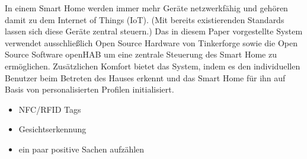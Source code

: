 %
In einem Smart Home werden immer mehr Geräte netzwerkfähig und gehören damit zu dem Internet of Things (IoT).
(Mit bereits existierenden Standards lassen sich diese Geräte zentral steuern.)
Das in diesem Paper vorgestellte System verwendet ausschließlich Open Source Hardware von Tinkerforge sowie die Open Source Software openHAB
um eine zentrale Steuerung des Smart Home zu ermöglichen.
Zusätzlichen Komfort bietet das System, indem es den individuellen Benutzer beim Betreten des Hauses erkennt und das Smart Home für ihn auf Basis von personalisierten Profilen initialisiert.
\begin{itemize}
	\item NFC/RFID Tags
	\item Gesichtserkennung
	\item ein paar positive Sachen aufzählen
\end{itemize}